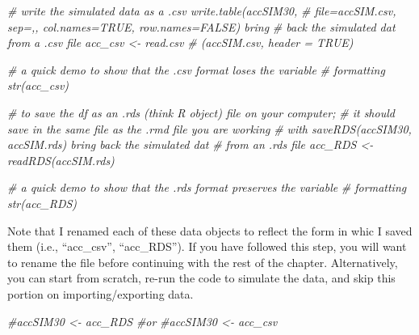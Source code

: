 \documentclass[
  11pt,
]{book}
\newenvironment{Shaded}{\begin{snugshade}}{\end{snugshade}}
\newcommand{\CommentTok}[1]{\textcolor[rgb]{0.56,0.35,0.01}{\textit{#1}}}
\begin{document}
\begin{Shaded}
\begin{Highlighting}[]
\CommentTok{\# write the simulated data as a .csv write.table(accSIM30,}
\CommentTok{\# file=\textquotesingle{}accSIM.csv\textquotesingle{}, sep=\textquotesingle{},\textquotesingle{}, col.names=TRUE, row.names=FALSE) bring}
\CommentTok{\# back the simulated dat from a .csv file acc\_csv \textless{}{-} read.csv}
\CommentTok{\# (\textquotesingle{}accSIM.csv\textquotesingle{}, header = TRUE)}
\end{Highlighting}
\end{Shaded}

\begin{Shaded}
\begin{Highlighting}[]
\CommentTok{\# a quick demo to show that the .csv format loses the variable}
\CommentTok{\# formatting str(acc\_csv)}
\end{Highlighting}
\end{Shaded}

\begin{Shaded}
\begin{Highlighting}[]
\CommentTok{\# to save the df as an .rds (think \textquotesingle{}R object\textquotesingle{}) file on your computer;}
\CommentTok{\# it should save in the same file as the .rmd file you are working}
\CommentTok{\# with saveRDS(accSIM30, \textquotesingle{}accSIM.rds\textquotesingle{}) bring back the simulated dat}
\CommentTok{\# from an .rds file acc\_RDS \textless{}{-} readRDS(\textquotesingle{}accSIM.rds\textquotesingle{})}
\end{Highlighting}
\end{Shaded}

\begin{Shaded}
\begin{Highlighting}[]
\CommentTok{\# a quick demo to show that the .rds format preserves the variable}
\CommentTok{\# formatting str(acc\_RDS)}
\end{Highlighting}
\end{Shaded}

Note that I renamed each of these data objects to reflect the form in whic I saved them (i.e., ``acc\_csv'', ``acc\_RDS''). If you have followed this step, you will want to rename the file before continuing with the rest of the chapter. Alternatively, you can start from scratch, re-run the code to simulate the data, and skip this portion on importing/exporting data.

\begin{Shaded}
\begin{Highlighting}[]
\CommentTok{\#accSIM30 \textless{}{-} acc\_RDS}
\CommentTok{\#or}
\CommentTok{\#accSIM30 \textless{}{-} acc\_csv}
\end{Highlighting}
\end{Shaded}
\end{document}
